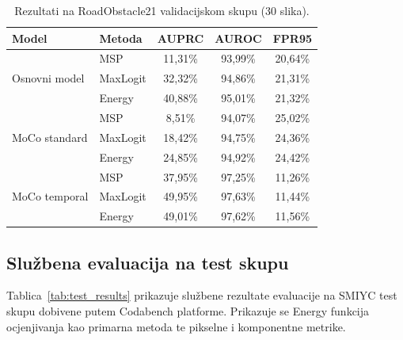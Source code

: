 \documentclass[diplomskirad]{fer}
\begin{document}
\begin{table}[H]
	\centering
	\caption{Rezultati na RoadObstacle21 validacijskom skupu
		(30 slika).}
	\label{tab:val_obstacle}
	\begin{tabular}{|l|l|c|c|c|}
		\hline
		\textbf{Model} & \textbf{Metoda} & \textbf{AUPRC} &
		\textbf{AUROC} & \textbf{FPR95} \\
		\hline
		\multirow{3}{*}{Osnovni model}
		& MSP      & 11{,}31\% & 93{,}99\% & 20{,}64\% \\
		& MaxLogit & 32{,}32\% & 94{,}86\% & 21{,}31\% \\
		& Energy   & 40{,}88\% & 95{,}01\% & 21{,}32\% \\
		\hline
		\multirow{3}{*}{MoCo standard}
		& MSP      &  8{,}51\% & 94{,}07\% & 25{,}02\% \\
		& MaxLogit & 18{,}42\% & 94{,}75\% & 24{,}36\% \\
		& Energy   & 24{,}85\% & 94{,}92\% & 24{,}42\% \\
		\hline
		\multirow{3}{*}{MoCo temporal}
		& MSP      & 37{,}95\% & 97{,}25\% & 11{,}26\% \\
		& MaxLogit & 49{,}95\% & 97{,}63\% & 11{,}44\% \\
		& Energy   & 49{,}01\% & 97{,}62\% & 11{,}56\% \\
		\hline
	\end{tabular}
\end{table}

\subsection{Službena evaluacija na test skupu}

Tablica~\ref{tab:test_results} prikazuje službene rezultate
evaluacije na SMIYC test skupu dobivene putem Codabench platforme.
Prikazuje se Energy funkcija ocjenjivanja kao primarna metoda te
pikselne i komponentne metrike.
\end{document}
